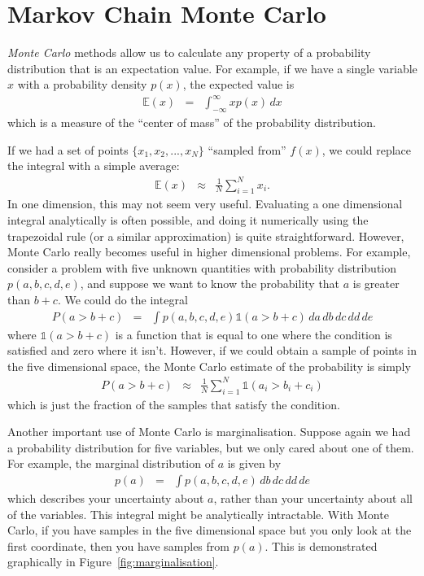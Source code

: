 \section{Markov Chain Monte Carlo}
{\it Monte Carlo} methods allow us to calculate any property of a probability
distribution that is an expectation value. For example, if we have a
single variable
$x$ with a probability density $p(x)$, the expected value is
\begin{eqnarray}
\mathds{E}(x) &=& \int_{-\infty}^{\infty} x p(x) \, dx 
\end{eqnarray}
which is a measure of the ``center of mass'' of the probability distribution.

If we had a set of points $\{x_1, x_2, ..., x_N\}$ ``sampled from'' $f(x)$,
we could replace the integral with a simple average:
\begin{eqnarray}
\mathds{E}(x) &\approx& \frac{1}{N} \sum_{i=1}^N x_i.
\end{eqnarray}
In one dimension, this may not seem very useful. Evaluating a one dimensional
integral analytically is often possible, and doing it numerically using the
trapezoidal rule (or a similar approximation) is quite straightforward.
However, Monte Carlo really becomes useful in higher dimensional problems.
For example, consider a problem with five unknown quantities with probability
distribution $p(a, b, c, d, e)$, and suppose we want to know the probability
that $a$ is greater than $b + c$. We could do the integral
\begin{eqnarray}
P(a > b + c) &=& \int p(a, b, c, d, e) \mathds{1}\left(a > b + c\right) \, da \, db \, dc \,dd \,de 
\end{eqnarray}
where $\mathds{1}\left(a > b + c\right)$ is a function that is equal to one
where the condition is satisfied and zero where it isn't. However, if we could
obtain a sample of points in the five dimensional space, the Monte Carlo
estimate of the probability is simply
\begin{eqnarray}
P(a > b + c) &\approx& \frac{1}{N}\sum_{i=1}^N \mathds{1}\left(a_i > b_i + c_i\right)
\end{eqnarray}
which is just the fraction of the samples that satisfy the condition.

Another important use of Monte Carlo is marginalisation. Suppose again we had
a probability distribution for five variables, but we only cared about one of
them. For example, the marginal distribution of $a$ is given by
\begin{eqnarray}
p(a) &=& \int p(a, b, c, d, e) \, db \, dc \, dd \, de
\end{eqnarray}
which describes your uncertainty about $a$, rather than your uncertainty about
all of the variables. This integral might be analytically intractable. With
Monte Carlo, if you have samples in the five dimensional space but you only
look at the first coordinate, then you have samples from $p(a)$. This is
demonstrated graphically in Figure~\ref{fig:marginalisation}.

